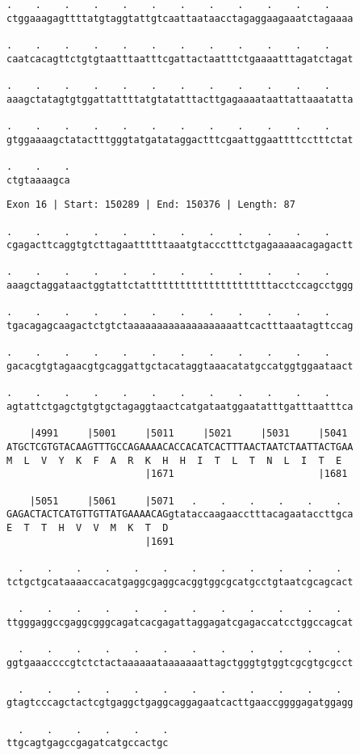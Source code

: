 \documentclass{article}
\begin{document}
\begin{Verbatim}
.    .    .    .    .    .    .    .    .    .    .    .    
ctggaaagagttttatgtaggtattgtcaattaataacctagaggaagaaatctagaaaa
  
.    .    .    .    .    .    .    .    .    .    .    .    
caatcacagttctgtgtaatttaatttcgattactaatttctgaaaatttagatctagat
  
.    .    .    .    .    .    .    .    .    .    .    .    
aaagctatagtgtggattattttatgtatatttacttgagaaaataattattaaatatta
  
.    .    .    .    .    .    .    .    .    .    .    .    
gtggaaaagctatactttgggtatgatataggactttcgaattggaattttcctttctat
  
.    .    .
ctgtaaaagca
\end{Verbatim}
\newpage
\begin{Verbatim}
Exon 16 | Start: 150289 | End: 150376 | Length: 87
 
.    .    .    .    .    .    .    .    .    .    .    .    
cgagacttcaggtgtcttagaattttttaaatgtaccctttctgagaaaaacagagactt
  
.    .    .    .    .    .    .    .    .    .    .    .    
aaagctaggataactggtattctattttttttttttttttttttttacctccagcctggg
  
.    .    .    .    .    .    .    .    .    .    .    .    
tgacagagcaagactctgtctaaaaaaaaaaaaaaaaaaattcactttaaatagttccag
  
.    .    .    .    .    .    .    .    .    .    .    .    
gacacgtgtagaacgtgcaggattgctacataggtaaacatatgccatggtggaataact
  
.    .    .    .    .    .    .    .    .    .    .    .    
agtattctgagctgtgtgctagaggtaactcatgataatggaatatttgatttaatttca
  
    |4991     |5001     |5011     |5021     |5031     |5041 
ATGCTCGTGTACAAGTTTGCCAGAAAACACCACATCACTTTAACTAATCTAATTACTGAA
M  L  V  Y  K  F  A  R  K  H  H  I  T  L  T  N  L  I  T  E  
                        |1671                         |1681 
  
    |5051     |5061     |5071   .    .    .    .    .    .  
GAGACTACTCATGTTGTTATGAAAACAGgtataccaagaacctttacagaataccttgca
E  T  T  H  V  V  M  K  T  D                                
                        |1691                               
  
  .    .    .    .    .    .    .    .    .    .    .    .  
tctgctgcataaaaccacatgaggcgaggcacggtggcgcatgcctgtaatcgcagcact
  
  .    .    .    .    .    .    .    .    .    .    .    .  
ttgggaggccgaggcgggcagatcacgagattaggagatcgagaccatcctggccagcat
  
  .    .    .    .    .    .    .    .    .    .    .    .  
ggtgaaaccccgtctctactaaaaaataaaaaaattagctgggtgtggtcgcgtgcgcct
  
  .    .    .    .    .    .    .    .    .    .    .    .  
gtagtcccagctactcgtgaggctgaggcaggagaatcacttgaaccggggagatggagg
  
  .    .    .    .    .    .
ttgcagtgagccgagatcatgccactgc
\end{Verbatim}
\end{document}
